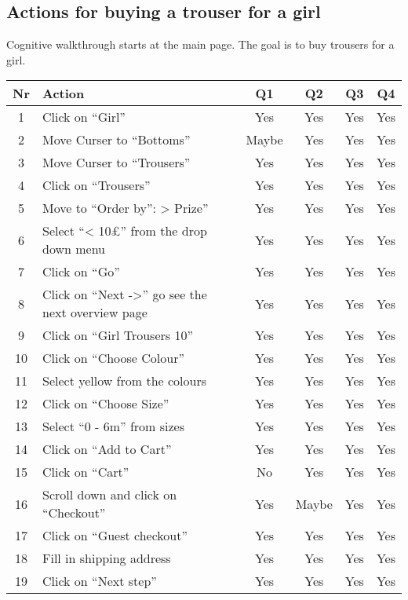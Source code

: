\documentclass[fontsize=12pt,paper=a4]{scrartcl}
\begin{document}
\subsection{Actions for buying a trouser for a girl}
Cognitive walkthrough starts at the main page. The goal is to buy trousers for a girl.  
\begin{table}[htdp]
\begin{center}
\begin{tabular}{|c|l|c|c|c|c|}
\hline
\textbf{Nr} & \textbf{Action} & \textbf{Q1} & \textbf{Q2} & \textbf{Q3} &\textbf{Q4} \\
\hline
1 & Click on ``Girl''& Yes & Yes & Yes & Yes\\
\hline
2 & Move Curser to ``Bottoms'' & Maybe & Yes & Yes & Yes \\
\hline
3 & Move Curser to ``Trousers'' & Yes & Yes & Yes & Yes \\
\hline
4 & Click on ``Trousers'' & Yes & Yes & Yes & Yes \\
\hline
5 & Move to ``Order by'': > Prize'' & Yes & Yes & Yes & Yes \\
\hline
6 & Select ``< 10\pounds'' from the drop down menu & Yes & Yes & Yes & Yes\\
\hline
7 & Click on ``Go'' & Yes & Yes & Yes & Yes\\
\hline
8 & Click on ``Next ->'' go see the next overview page & Yes & Yes & Yes & Yes\\
\hline
9 & Click on ``Girl Trousers 10'' & Yes & Yes & Yes & Yes\\
\hline
10 & Click on ``Choose Colour'' & Yes & Yes & Yes & Yes\\
\hline
11 & Select yellow from the colours & Yes & Yes & Yes & Yes\\
\hline
12 & Click on ``Choose Size'' & Yes & Yes & Yes & Yes\\
\hline
13 & Select ``0 - 6m'' from sizes & Yes & Yes & Yes & Yes\\
\hline
14 & Click on ``Add to Cart'' & Yes & Yes & Yes & Yes\\
\hline
15 & Click on ``Cart'' & No & Yes & Yes & Yes\\
\hline
16 & Scroll down and click on ``Checkout'' & Yes & Maybe & Yes & Yes\\
\hline
17 & Click on ``Guest checkout'' & Yes & Yes & Yes & Yes\\
\hline
18 & Fill in shipping address & Yes & Yes & Yes & Yes\\
\hline
19 & Click on ``Next step'' & Yes & Yes & Yes & Yes\\

\end{tabular}
\end{center}
\end{table}
\end{document}
